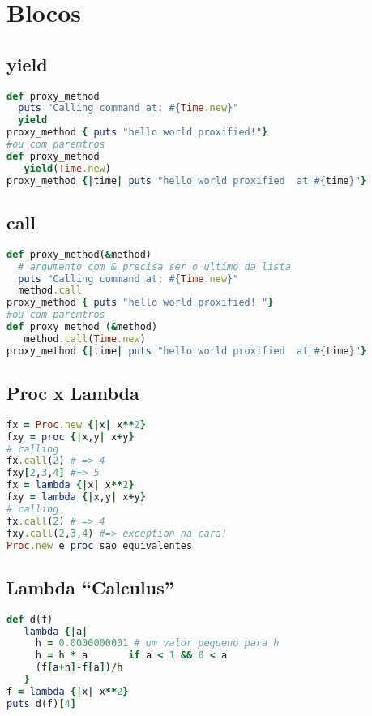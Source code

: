 \documentclass[serif,mathserif]{book}
\begin{document}
\chapter{Blocos}

\section{yield}
\begin{lstlisting}[language=ruby]
def proxy_method
  puts "Calling command at: #{Time.new}"
  yield
proxy_method { puts "hello world proxified!"}
#ou com paremtros
def proxy_method
   yield(Time.new)
proxy_method {|time| puts "hello world proxified  at #{time}"}
\end{lstlisting}

\section{call}
\begin{lstlisting}[language=ruby]
def proxy_method(&method)
  # argumento com & precisa ser o ultimo da lista
  puts "Calling command at: #{Time.new}"
  method.call
proxy_method { puts "hello world proxified! "}
#ou com paremtros
def proxy_method (&method)
   method.call(Time.new)
proxy_method {|time| puts "hello world proxified  at #{time}"}
\end{lstlisting}

\section{Proc x Lambda}
\begin{lstlisting}[language=ruby]
fx = Proc.new {|x| x**2}
fxy = proc {|x,y| x+y}
# calling
fx.call(2) # => 4
fxy[2,3,4] #=> 5
fx = lambda {|x| x**2}
fxy = lambda {|x,y| x+y}
# calling
fx.call(2) # => 4
fxy.call(2,3,4) #=> exception na cara!
Proc.new e proc sao equivalentes
\end{lstlisting}


\section{Lambda ``Calculus''}

\begin{lstlisting}[language=ruby, caption="Derivada em Ruby"]
def d(f)
   lambda {|a|
     h = 0.0000000001 # um valor pequeno para h
     h = h * a       if a < 1 && 0 < a
     (f[a+h]-f[a])/h
   }
f = lambda {|x| x**2}
puts d(f)[4]
\end{lstlisting}
\end{document}
